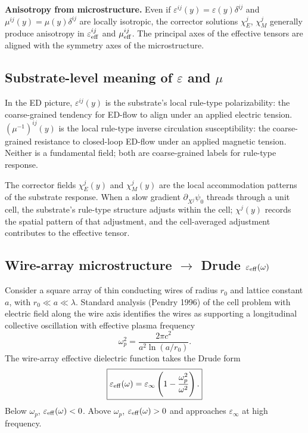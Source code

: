 \documentclass[11pt,a4paper]{article}
\begin{document}
\textbf{Anisotropy from microstructure.} Even if $\varepsilon^{ij}(y) = \varepsilon(y)\delta^{ij}$ and $\mu^{ij}(y) = \mu(y)\delta^{ij}$ are locally isotropic, the corrector solutions $\chi_E^j$, $\chi_M^j$ generally produce anisotropy in $\varepsilon_{\rm eff}^{ij}$ and $\mu_{\rm eff}^{ij}$. The principal axes of the effective tensors are aligned with the symmetry axes of the microstructure.

\subsection{Substrate-level meaning of $\varepsilon$ and $\mu$}

In the ED picture, $\varepsilon^{ij}(y)$ is the substrate's local rule-type polarizability: the coarse-grained tendency for ED-flow to align under an applied electric tension. $(\mu^{-1})^{ij}(y)$ is the local rule-type inverse circulation susceptibility: the coarse-grained resistance to closed-loop ED-flow under an applied magnetic tension. Neither is a fundamental field; both are coarse-grained labels for rule-type response.

The corrector fields $\chi_E^j(y)$ and $\chi_M^j(y)$ are the local accommodation patterns of the substrate response. When a slow gradient $\partial_{X^j}\psi_0$ threads through a unit cell, the substrate's rule-type structure adjusts within the cell; $\chi^j(y)$ records the spatial pattern of that adjustment, and the cell-averaged adjustment contributes to the effective tensor.

\subsection{Wire-array microstructure $\to$ Drude $\varepsilon_{\rm eff}(\omega)$}

Consider a square array of thin conducting wires of radius $r_0$ and lattice constant $a$, with $r_0 \ll a \ll \lambda$. Standard analysis (Pendry 1996) of the cell problem with electric field along the wire axis identifies the wires as supporting a longitudinal collective oscillation with effective plasma frequency
\[
\omega_p^2 = \frac{2\pi c^2}{a^2 \ln(a/r_0)}.
\]
The wire-array effective dielectric function takes the Drude form
\[
\boxed{\varepsilon_{\rm eff}(\omega) = \varepsilon_\infty\left(1 - \frac{\omega_p^2}{\omega^2}\right).}
\]
Below $\omega_p$, $\varepsilon_{\rm eff}(\omega) < 0$. Above $\omega_p$, $\varepsilon_{\rm eff}(\omega) > 0$ and approaches $\varepsilon_\infty$ at high frequency.
\end{document}
